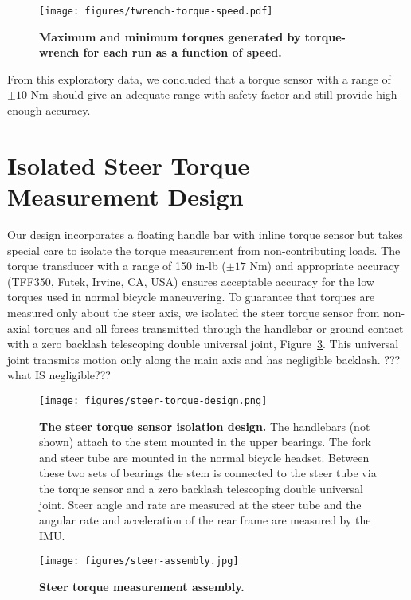 \documentclass[10pt]{article}
\begin{document}
\begin{figure}
  \centering
  \texttt{[image: figures/twrench-torque-speed.pdf]}
  \caption{{\bf Maximum  and minimum torques generated by torque-wrench for each run as a function of speed.}
    }
  \label{fig:twrench-torque-speed}
\end{figure}

From this exploratory data, we concluded that a torque sensor with a range of $\pm10$ Nm
should give an adequate range with safety factor and still provide high
enough accuracy.

\section*{Isolated Steer Torque Measurement Design}

Our design incorporates a floating handle bar with inline torque sensor but
takes special care to isolate the torque measurement from non-contributing
loads. The torque transducer with a range of 150 in-lb ($\pm 17$ Nm) and appropriate accuracy 
(TFF350, Futek, Irvine, CA, USA) ensures acceptable accuracy for the low torques used in normal
bicycle maneuvering. To guarantee that torques are measured only about the
steer axis, we isolated the steer torque sensor from non-axial
torques and all forces transmitted through the handlebar or ground contact with
a zero backlash telescoping double universal joint,
Figure~\ref{fig:steer-torque-design}. This universal joint  transmits motion only
along the main axis and has negligible backlash. ??? what IS negligible???

\begin{figure}
  \centering
  \texttt{[image: figures/steer-torque-design.png]}
  \caption{{\bf The steer torque sensor isolation design.} The handlebars (not shown) attach to
    the stem mounted in the upper bearings. The fork and steer tube
    are mounted in the normal bicycle headset. Between these two sets of
    bearings the stem is connected to the steer tube via the torque sensor and a
    zero backlash telescoping double universal joint. Steer angle and rate
    are measured at the steer tube and the angular rate and acceleration of the rear frame
    are measured by the IMU.}
  \label{fig:steer-torque-design}
\end{figure}

\begin{figure}
  \centering
  \texttt{[image: figures/steer-assembly.jpg]}
  \caption{{\bf Steer torque measurement assembly.} }
  \label{fig:steer-torque-design}
\end{figure}
\end{document}
